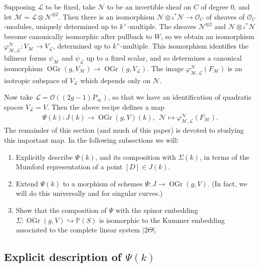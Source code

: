 \documentclass{article} %
\numberwithin{equation}{section}
\newcommand{\sh}[1]{\mathscr{#1}}
\renewcommand{\P}{\mathbb{P}}
\renewcommand{\O}{\mathcal{O}}
\newcommand{\cO}{\mathcal{O}}
\DeclareMathOperator{\OGr}{OGr}
\begin{document}
Supposing $\sh{L}$ to be fixed, take $\sh{N}$ to be an invertible sheaf on $C$ of degree 0, and let $\sh{M} = \sh{L}\otimes \sh{N}^{\otimes 2}$. Then there is an isomorphism $\sh{N} \otimes \iota^* \sh{N} \rightarrow \O_{C}$ of sheaves of $\cO_C$-modules, uniquely determined up to $k^\times$-multiple. The sheaves $\sh{N}^{\otimes 2}$ and $\sh{N} \otimes \iota^\ast \sh{N}$ become canonically isomorphic after pullback to $W$, so we obtain an isomorphism $\varphi^{\sh{N}}_{\sh{M}, \sh{L}}\colon V_{\sh{M}} \rightarrow V_{\sh{L}}$, determined up to $k^{\times}$-multiple.
This isomorphism identifies the bilinear forms $\psi_{\sh{M}}$ and $\psi_{\sh{L}}$ up to a fixed scalar, and so determines a canonical isomorphism $\OGr(g, V_{\sh{M}}) \to \OGr(g, V_{\sh{L}})$. The image $\varphi^{\sh{N}}_{\sh{M}, \sh{L}}(F_{\sh{M}})$ is an isotropic subspace of $V_{\sh{L}}$ which depends only on $\sh{N}$.

Now take $\sh{L} = \O((2g-1)P_{\infty})$, so that we have an identification of quadratic spaces $V_{\sh{L}} = V$.
Then the above recipe defines a map 
\begin{align}\label{equation_firstversion_keyconstruction}
\Psi(k)\colon J(k) \rightarrow \OGr(g,V)(k),
\:\:\sh{N}\mapsto \varphi_{\sh{M}, \sh{L}}^{\sh{N}}(F_{\sh{M}}).
\end{align}
The remainder of this section (and much of this paper) is devoted to studying this important map. 
In the following subsections we will:
\begin{enumerate}
    \item Explicitly describe $\Psi(k)$, and its composition with $\Sigma(k)$, in terms of the Mumford representation of a point $[D] \in J(k)$.
    \item Extend $\Psi(k)$ to a morphism of schemes $\Psi\colon J\rightarrow \OGr(g, V)$. (In fact, we will do this universally and for singular curves.)
    \item Show that the composition of $\Psi$ with the spinor embedding $\Sigma: \OGr(g,V)\hookrightarrow \P(S)$ is isomorphic to the Kummer embedding associated to the complete linear system $|2\Theta|$.
\end{enumerate}



\subsection{Explicit description of $\Psi(k)$}\label{subsec_explicit_Kummer_embedding}
\end{document}

